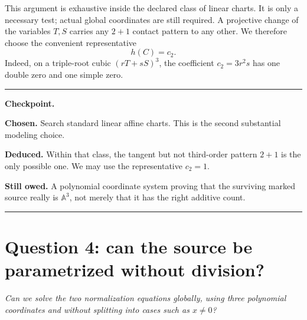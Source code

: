 \documentclass[11pt,a4paper]{article}
\numberwithin{equation}{section}
\theoremstyle{definition}
\theoremstyle{remark}
\newcommand{\A}{\mathbb A}
\newenvironment{userquestion}
  {\par\medskip\noindent{\color{userblue}\bfseries USER}\quad
   \begin{minipage}[t]{0.84\linewidth}\itshape}
  {\end{minipage}\par\medskip}
\newenvironment{modelanswer}
  {\par\smallskip\noindent{\color{modelgreen}\bfseries MODEL}\par\smallskip}
  {\par\medskip}
\newenvironment{checkpoint}
  {\par\smallskip\noindent\color{paperblue}\hrule\color{black}
   \vspace{0.55em}\noindent\begin{minipage}{\linewidth}\small
   \textbf{Checkpoint.}\par\smallskip}
  {\end{minipage}\vspace{0.45em}\color{paperblue}\hrule\color{black}
   \par\medskip}
\newcommand{\chosen}[1]{\textbf{Chosen.} #1\par\smallskip}
\newcommand{\deduced}[1]{\textbf{Deduced.} #1\par\smallskip}
\newcommand{\owed}[1]{\textbf{Still owed.} #1}
\begin{document}
\begin{modelanswer}
This argument is exhaustive inside the declared class of linear charts.  It
is only a necessary test; actual global coordinates are still required.  A
projective change of the variables \(T,S\) carries any \(2+1\) contact pattern
to any other.  We therefore choose the convenient representative
\[
  h(C)=c_2.
\]
Indeed, on a triple-root cubic \((rT+sS)^3\), the coefficient \(c_2=3r^2s\)
has one double zero and one simple zero.
\end{modelanswer}

\begin{checkpoint}
\chosen{Search standard linear affine charts.  This is the second substantial
modeling choice.}
\deduced{Within that class, the tangent but not third-order pattern \(2+1\) is
the only possible one.  We may use the representative \(c_2=1\).}
\owed{A polynomial coordinate system proving that the surviving marked source
really is \(\A^3\), not merely that it has the right additive count.}
\end{checkpoint}

\section{Question 4: can the source be parametrized without division?}

\begin{userquestion}
Can we solve the two normalization equations globally, using three polynomial
coordinates and without splitting into cases such as \(x\ne0\)?
\end{userquestion}
\end{document}

